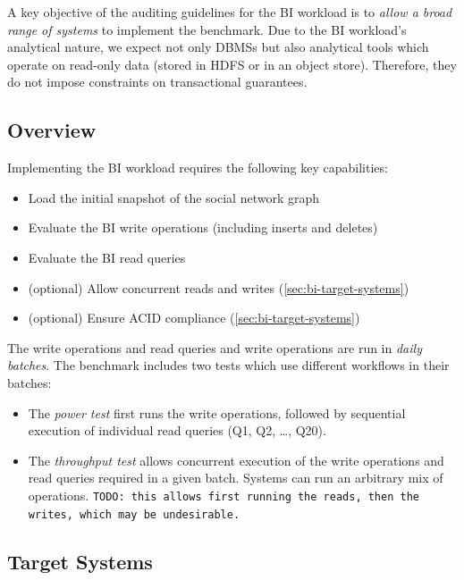 A key objective of the auditing guidelines for the BI workload is to \emph{allow a broad range of systems} to implement the benchmark.
Due to the BI workload's analytical nature, we expect not only DBMSs but also analytical tools which operate on read-only data (stored \eg in HDFS or in an object store).
Therefore, they do not impose constraints on transactional guarantees.

\subsection{Overview}
\label{sec:bi-audit-overview}

Implementing the BI workload requires the following key capabilities:

\begin{itemize}
    \item Load the initial snapshot of the social network graph
    \item Evaluate the BI write operations (including inserts and deletes)
    \item Evaluate the BI read queries
    \item (optional) Allow concurrent reads and writes (\autoref{sec:bi-target-systems})
    \item (optional) Ensure ACID compliance (\autoref{sec:bi-target-systems})
\end{itemize}

The write operations and read queries and write operations are run in \emph{daily batches}.
The benchmark includes two tests which use different workflows in their batches:

\begin{itemize}
    \item The \emph{power test} first runs the write operations, followed by sequential execution of individual read queries (Q1, Q2, \ldots, Q20).
    \item The \emph{throughput test} allows concurrent execution of the write operations and read queries required in a given batch.
    Systems can run an arbitrary mix of operations. \texttt{TODO: this allows first running the reads, then the writes, which may be undesirable.}
\end{itemize}

\subsection{Target Systems}
\label{sec:bi-target-systems}

